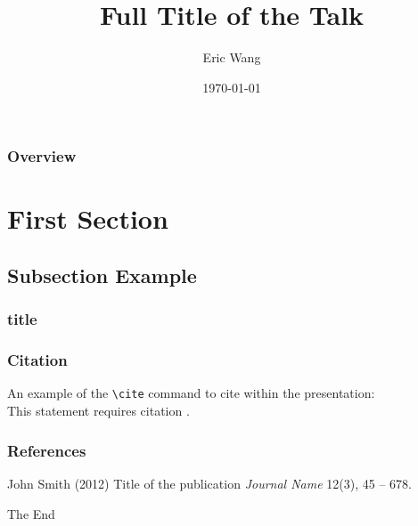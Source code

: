 \documentclass{beamer}
\title[Short title]{Full Title of the Talk}
\author{Eric Wang}
\institute[ECPKN]{
Ecole Centrale de P\'ekin\\
\medskip
\textit{wangchaogo1990 dot at gmail.com}
}
\date{\today} %
\begin{document}
\begin{frame}[fragile]
\thispagestyle{empty}
\titlepage
\end{frame}

\begin{frame}[fragile]
\frametitle{Overview}
\tableofcontents
\end{frame}

\section{First Section}
\subsection{Subsection Example}

\begin{frame}[fragile]
\frametitle{title}
\end{frame}

\begin{frame}[fragile] %
\frametitle{Citation}
An example of the \verb+\cite+ command to cite within the presentation: \\

This statement requires citation \cite{p1}.
\end{frame}

\begin{frame}[fragile]
\frametitle{References}
\footnotesize{
\begin{thebibliography}{99} %
 John Smith (2012) Title of the publication \emph{Journal Name} 12(3), 45 -- 678.
\end{thebibliography}
}
\end{frame}

\begin{frame}[fragile]
\Huge{\centerline{The End}}
\end{frame}
\end{document}
